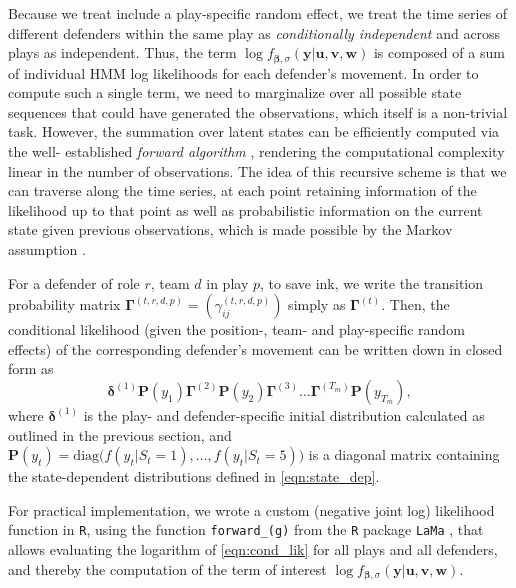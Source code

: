 \documentclass[namedate,webpdf,modern,medium]{oup-authoring-template}
\providecommand{\DIFdel}[1]{{\protect\color{red}#1}} %
\providecommand{\DIFdelbegin}{} %
\providecommand{\DIFdelend}{} %
\begin{document}
Because we \DIFdelbegin \DIFdel{treat }\DIFdelend include a play-specific random effect, we treat the time series of different defenders within the same play as \emph{conditionally independent} and across plays as independent. Thus, the term $\log f_{\bm{\beta}, \sigma}(\bm{y} \vert \bm{u}, \bm{v}, \bm{w})$ %
is composed of a sum of individual HMM log likelihoods for each defender's movement. %
In order to compute such a single term, we need to marginalize over all possible state sequences that could have generated the observations, which itself is a non-trivial task. However, the summation over latent states can be efficiently computed via the well- established \textit{forward algorithm} \citep{zucchini, mews2025build}, rendering the computational complexity linear in the number of observations. The idea of this recursive scheme is that we can traverse along the time series, at each point retaining information of the likelihood up to that point as well as probabilistic information on the current state given previous observations, which is made possible by the Markov assumption \citep{lystig2002exact}.

For a defender %
of role $r$, team $d$ in play $p$, to save ink, we write the transition probability matrix $\bm{\Gamma}^{(t,r,d,p)} = (\gamma_{ij}^{(t,r,d,p)})$ simply as $\bm{\Gamma}^{(t)}$. 
Then, the conditional likelihood (given the position-, team- and play-specific random effects) of the corresponding defender's movement can be written down in closed form as
\begin{equation}
    \label{eqn:cond_lik}
    \bm{\delta}^{(1)} \bm{P}(y_1) \bm{\Gamma}^{(2)} \bm{P}(y_2) \bm{\Gamma}^{(3)} \dotsc \bm{\Gamma}^{(T_m)} \bm{P}(y_{T_m}),
\end{equation}
where $\bm{\delta}^{(1)}$ is the play- and defender-specific initial distribution calculated as outlined in the previous section, and $\bm{P}(y_t) = \text{diag}\bigl(f(y_t \vert S_t = 1), \dotsc, f(y_t \vert S_t = 5)\bigr)$ is a diagonal matrix containing the state-dependent distributions defined in \eqref{eqn:state_dep}.

For practical implementation, we wrote a custom (negative joint log) likelihood function in \texttt{R}, using the function \texttt{forward\DIFdelbegin \DIFdel{\_}\DIFdelend (\DIFdelbegin \DIFdel{g}\DIFdelend )} 
from the \texttt{R} package \texttt{LaMa} \citep{koslikLaMa2025}, that allows evaluating the logarithm of \eqref{eqn:cond_lik} for all plays and all defenders, and thereby the computation of the term of interest $\log f_{\bm{\beta}, \sigma}(\bm{y} \vert \bm{u}, \bm{v}, \bm{w})$.
\end{document}
